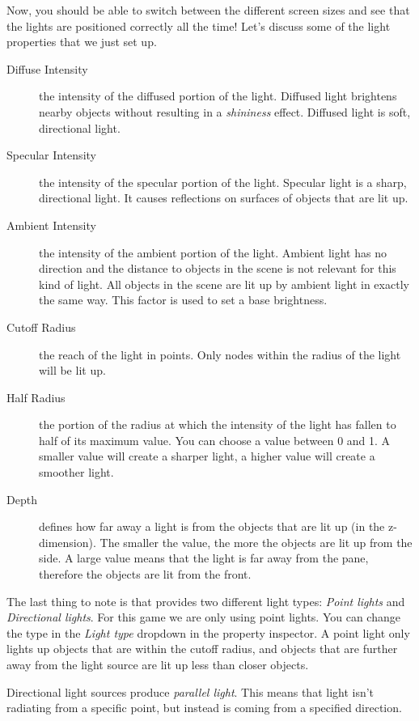 Now, you should be able to switch between the different screen sizes and see
that the lights are positioned correctly all the time! Let's discuss some of the
light properties that we just set up.

\begin{description}
\item[Diffuse Intensity] the intensity of the diffused portion of the light.
Diffused light brightens nearby objects without resulting in a
\textit{shininess} effect. Diffused light is soft, directional light.
\item[Specular Intensity] the intensity of the specular portion of the light.
Specular light is a sharp, directional light. It causes reflections on surfaces
of objects that are lit up.
\item[Ambient Intensity] the intensity of the ambient portion of the light.
Ambient light has no direction and the distance to objects in the scene is not
relevant for this kind of light. All objects in the scene are lit up by
ambient light in exactly the same way. This factor is used to set a base
brightness.
\item[Cutoff Radius] the reach of the light in points. Only nodes within the
radius of the light will be lit up.
\item[Half Radius] the portion of the radius at which the intensity of the light
has fallen to half of its maximum value. You can choose a value between 0 and 1.
A smaller value will create a sharper light, a higher value will create a
smoother light.
\item[Depth] defines how far away a light is from the objects that are lit up
(in the z-dimension). The smaller the value, the more the objects are lit up
from the side. A large value means that the light is far away from the pane,
therefore the objects are lit from the front.
\end{description}

The last thing to note is that \cocos{} provides two different light types:
\textit{Point lights} and \textit{Directional lights}. For this game we are only
using point lights. You can change the type in the \textit{Light type} dropdown
in the property inspector. A point light only lights up objects that are within
the cutoff radius, and objects that are further away from the light source are
lit up less than closer objects. 

Directional light sources produce \textit{parallel light}. This means that light
isn't radiating from a specific point, but instead is coming from a specified
direction.

